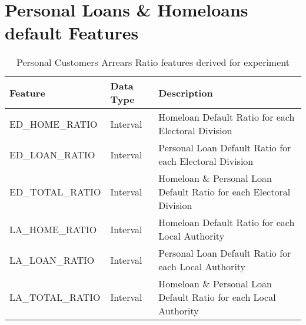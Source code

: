 
\chapter{Personal Loans \& Homeloans default Features} %

\label{AppendixD} %


\begin{table}[H]
	\centering
	\resizebox{\textwidth}{!}
	{
		\label{my-label}
		\begin{tabular}{|l|l|l|}
			\hline
			\textbf{Feature} & \textbf{Data Type} & \textbf{Description}                                                                                                                                                                                                                                                                                                                                                                                                                                                                                                                              \\ \hline
			ED\_HOME\_RATIO  & Interval & Homeloan Default Ratio for each Electoral Division \\ \hline
			ED\_LOAN\_RATIO  & Interval & Personal Loan Default Ratio for each Electoral Division \\ \hline
			ED\_TOTAL\_RATIO & Interval & Homeloan \& Personal Loan Default Ratio for each Electoral Division \\ \hline
			LA\_HOME\_RATIO  & Interval & Homeloan Default Ratio for each Local Authority \\ \hline
			LA\_LOAN\_RATIO  & Interval & Personal Loan Default Ratio for each Local Authority \\ \hline
			LA\_TOTAL\_RATIO & Interval & Homeloan \& Personal Loan Default Ratio for each Local Authority \\ \hline
		\end{tabular}
	}
	\caption{Personal Customers Arrears Ratio features derived for experiment}
\end{table}
